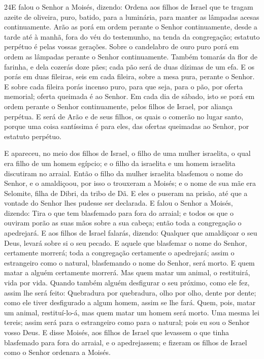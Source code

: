 \medskip

\lettrine{24} E falou o Senhor a Moisés, dizendo: Ordena
aos filhos de Israel que te tragam azeite de oliveira, puro, batido,
para a luminária, para manter as lâmpadas acesas continuamente.
Arão as porá em ordem perante o Senhor continuamente, desde a
tarde até à manhã, fora do véu do testemunho, na tenda da
congregação; estatuto perpétuo é pelas vossas gerações. Sobre o
candelabro de ouro puro porá em ordem as lâmpadas perante o Senhor
continuamente. Também tomarás da flor de farinha, e dela cozerás
doze pães; cada pão será de duas dízimas de um efa. E os porás
em duas fileiras, seis em cada fileira, sobre a mesa pura, perante o
Senhor. E sobre cada fileira porás incenso puro, para que seja,
para o pão, por oferta memorial; oferta queimada é ao Senhor. Em
cada dia de sábado, isto se porá em ordem perante o Senhor
continuamente, pelos filhos de Israel, por aliança perpétua. E
será de Arão e de seus filhos, os quais o comerão no lugar santo,
porque uma coisa santíssima é para eles, das ofertas queimadas ao
Senhor, por estatuto perpétuo.

E apareceu, no meio dos filhos de Israel, o filho de uma mulher
israelita, o qual era filho de um homem egípcio; e o filho da
israelita e um homem israelita discutiram no arraial. Então o
filho da mulher israelita blasfemou o nome do Senhor, e o
amaldiçoou, por isso o trouxeram a Moisés; e o nome de sua mãe era
Selomite, filha de Dibri, da tribo de Dã. E eles o puseram na
prisão, até que a vontade do Senhor lhes pudesse ser declarada.
E falou o Senhor a Moisés, dizendo: Tira o que tem
blasfemado para fora do arraial; e todos os que o ouviram porão as
suas mãos sobre a sua cabeça; então toda a congregação o apedrejará.
E aos filhos de Israel falarás, dizendo: Qualquer que
amaldiçoar o seu Deus, levará sobre si o seu pecado. E aquele
que blasfemar o nome do Senhor, certamente morrerá; toda a
congregação certamente o apedrejará; assim o estrangeiro como o
natural, blasfemando o nome do Senhor, será morto. E quem
matar a alguém certamente morrerá. Mas quem matar um animal,
o restituirá, vida por vida. Quando também alguém desfigurar
o seu próximo, como ele fez, assim lhe será feito: Quebradura
por quebradura, olho por olho, dente por dente; como ele tiver
desfigurado a algum homem, assim se lhe fará. Quem, pois,
matar um animal, restituí-lo-á, mas quem matar um homem será morto.
Uma mesma lei tereis; assim será para o estrangeiro como para
o natural; pois eu sou o Senhor vosso Deus. E disse Moisés,
aos filhos de Israel que levassem o que tinha blasfemado para fora
do arraial, e o apedrejassem; e fizeram os filhos de Israel como o
Senhor ordenara a Moisés.

